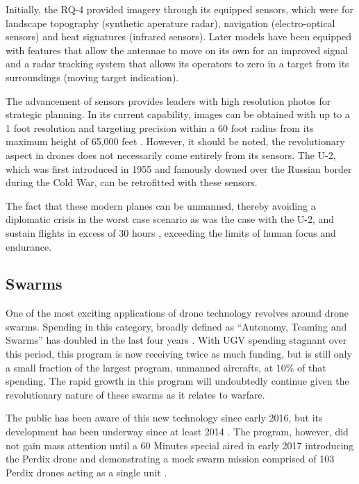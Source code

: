 \documentclass[sigconf]{acmart}
\begin{document}
Initially, the RQ-4 provided imagery through its equipped sensors, which were for landscape topography (synthetic aperature radar), navigation (electro-optical sensors) and heat signatures (infrared sensors). Later models have been equipped with features that allow the antennae to move on its own for an improved signal and a radar tracking system that allows its operators to zero in a target from its surroundings (moving target indication). 

The advancement of sensors provides leaders with high resolution photos for strategic planning. In its current capability, images can be obtained with up to a 1 foot resolution and targeting precision within a 60 foot radius from its maximum height of 65,000 feet \cite{forbesdrone}. However, it should be noted, the revolutionary aspect in drones does not necessarily come entirely from its sensors. The U-2, which was first introduced in 1955 and famously downed over the Russian border during the Cold War, can be retrofitted with these sensors. 

The fact that these modern planes can be unmanned, thereby avoiding a diplomatic crisis in the worst case scenario as was the case with the U-2, and sustain flights in excess of 30 hours \cite{foxtrot}, exceeding the limits of human focus and endurance. 

\subsection{Swarms}
One of the most exciting applications of drone technology revolves around drone swarms. Spending in this category, broadly defined as ``Autonomy, Teaming and Swarms'' has doubled in the last four years \cite{dronebudget}. With UGV spending stagnant over this period, this program is now receiving twice as much funding, but is still only a small fraction of the largest program, unmanned aircrafts, at $10\%$ of that spending. The rapid growth in this program will undoubtedly continue given the revolutionary nature of these swarms as it relates to warfare.

The public has been aware of this new technology since early 2016, but its development has been underway since at least 2014 \cite{washpost}. The program, however, did not gain mass attention until a 60 Minutes special aired in early 2017 introducing the Perdix drone and demonstrating a mock swarm mission comprised of 103 Perdix drones acting as a single unit \cite{60minutes}. 
\end{document}
